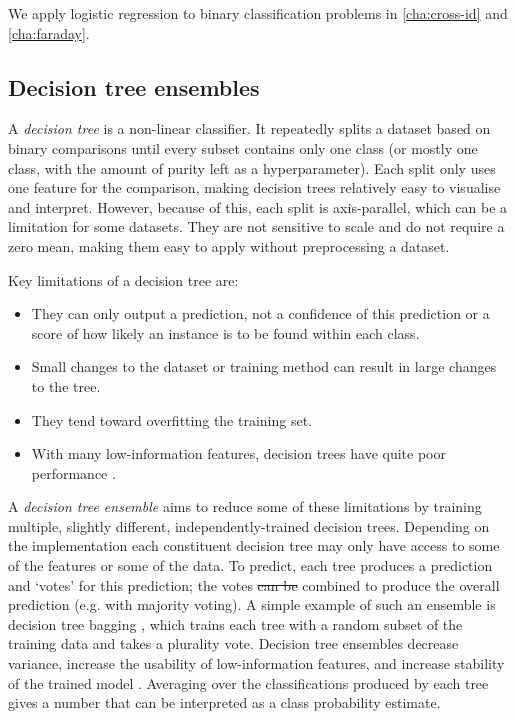 \documentclass[11pt, a4paper]{book}
\newcommand{\defn}[1]{\emph{#1}}
\providecommand{\DIFaddtex}[1]{{\protect\color{blue}\uwave{#1}}} %
\providecommand{\DIFdeltex}[1]{{\protect\color{red}\sout{#1}}}                      %
\providecommand{\DIFaddbegin}{} %
\providecommand{\DIFaddend}{} %
\providecommand{\DIFdelbegin}{} %
\providecommand{\DIFdelend}{} %
\providecommand{\DIFadd}[1]{\texorpdfstring{\DIFaddtex{#1}}{#1}} %
\providecommand{\DIFdel}[1]{\texorpdfstring{\DIFdeltex{#1}}{}} %
\newcommand{\DIFscaledelfig}{0.5}
\newlength{\DIFdelgraphicswidth} %
\newlength{\DIFdelgraphicsheight} %
\newcommand{\DIFaddincludegraphics}[2][]{{\color{blue}\fbox{\DIFOincludegraphics[#1]{#2}}}} %
\newcommand{\DIFdelincludegraphics}[2][]{%
\sbox{\DIFdelgraphicsbox}{\DIFOincludegraphics[#1]{#2}}%
\settoboxwidth{\DIFdelgraphicswidth}{\DIFdelgraphicsbox} %
\settoboxtotalheight{\DIFdelgraphicsheight}{\DIFdelgraphicsbox} %
\scalebox{\DIFscaledelfig}{%
\parbox[b]{\DIFdelgraphicswidth}{\usebox{\DIFdelgraphicsbox}\\[-\baselineskip] \rule{\DIFdelgraphicswidth}{0em}}\llap{\resizebox{\DIFdelgraphicswidth}{\DIFdelgraphicsheight}{%
\setlength{\unitlength}{\DIFdelgraphicswidth}%
\begin{picture}(1,1)%
\thicklines\linethickness{2pt} %
{\color[rgb]{1,0,0}\put(0,0){\framebox(1,1){}}}%
{\color[rgb]{1,0,0}\put(0,0){\line( 1,1){1}}}%
{\color[rgb]{1,0,0}\put(0,1){\line(1,-1){1}}}%
\end{picture}%
}\hspace*{3pt}}} %
} %
\DeclareRobustCommand{\DIFaddbegin}{\DIFOaddbegin \let\includegraphics\DIFaddincludegraphics} %
\DeclareRobustCommand{\DIFaddend}{\DIFOaddend \let\includegraphics\DIFOincludegraphics} %
\DeclareRobustCommand{\DIFdelbegin}{\DIFOdelbegin \let\includegraphics\DIFdelincludegraphics} %
\DeclareRobustCommand{\DIFdelend}{\DIFOaddend \let\includegraphics\DIFOincludegraphics} %
\begin{document}
        We apply logistic regression to binary classification problems in \autoref{cha:cross-id} and \autoref{cha:faraday}.

    \subsection{Decision tree ensembles}
    \label{sec:decision-trees}

        A \defn{decision tree} is a non-linear classifier. It repeatedly splits a dataset based on binary comparisons until every subset contains only one class (or mostly one class, with the amount of purity left as a hyperparameter). Each split only uses one feature for the comparison, making decision trees relatively easy to visualise and interpret. However, because of this, each split is axis-parallel, which can be a limitation for some datasets. They are not sensitive to scale and do not require a zero mean, making them easy to apply without preprocessing a dataset.

        Key limitations of a decision tree are:
        \begin{itemize}
            \item They can only output a prediction, not a confidence of this prediction or a score of how likely an instance is to be found within each class.
            \item Small changes to the dataset or training method can result in large changes to the tree.
            \item They tend toward overfitting the training set.
            \item With many low-information features, decision trees have quite poor performance \citep{breiman01random-forest}.
        \end{itemize}

        A \defn{decision tree ensemble} aims to reduce some of these limitations by training multiple, slightly different, independently-trained decision trees. Depending on the implementation each constituent decision tree may only have access to some of the features or some of the data. To predict, each tree produces a prediction and `votes' for this prediction; the votes \DIFdelbegin \DIFdel{can be }\DIFdelend \DIFaddbegin \DIFadd{are }\DIFaddend combined to produce the overall prediction (e.g. with majority voting). A simple example of such an ensemble is decision tree bagging \citep{breiman_bagging_1996}, which trains each tree with a random subset of the training data and takes a plurality vote. Decision tree ensembles decrease variance, increase the usability of low-information features, and increase stability of the trained model \citep{breiman01random-forest}. Averaging over the classifications produced by each tree gives a number that can be interpreted as a class probability estimate.
\end{document}
